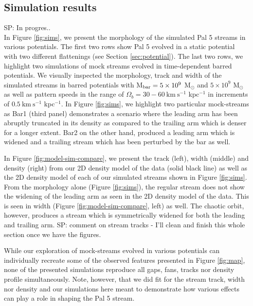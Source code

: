 \documentclass[twocolumn]{aastex62}
\newcommand{\kms}{\ensuremath{\textrm{km}~\textrm{s}^{-1}}}
\newcommand{\sa}[1]{{\color{magenta} SP: #1}}
\begin{document}
\subsection{Simulation results}
\label{sec:sim_results}
\sa{In progres..}\\
In Figure \ref{fig:sims}, we present the morphology of the simulated Pal 5 streams in various potentials.
The first two rows show Pal 5 evolved in a static potential with two different flattenings (see Section \ref{sec:potential}).
The last two rows, we highlight two simulations of mock streams evolved in time-dependent barred potentials. We visually inspected the morphology, track and width of the simulated streams in barred potentials with M$_{\rm bar} = 5\times 10^9$ M$_{\odot}$ and $5\times 10^9$ M$_{\odot}$ as well as pattern speeds in the range of $\Omega_b = 30-60 ~\kms$ kpc$^{-1}$ in increments of $0.5~\kms$ kpc$^{-1}$. In Figure \ref{fig:sims}, we highlight two particular mock-streams as Bar1 (third panel) demonstrates a scenario where the leading arm has been abruptly truncated in its density as compared to the trailing arm which is denser for a longer extent. Bar2 on the other hand, produced a leading arm which is widened  and a trailing stream which has been perturbed by the bar as well. 

In Figure \ref{fig:model-sim-compare}, we present the track (left), width (middle) and density (right) from our 2D density model of the data (solid black line) as well as the 2D density model of each of our simulated streams shown in Figure \ref{fig:sims}. From the morphology alone (Figure \ref{fig:sims}), the regular stream does not show the widening of the leading arm as seen in the 2D density model of the data. This is seen in width (Figure \ref{fig:model-sim-compare}, left) as well. The chaotic orbit, however, produces a stream which is symmetrically widened for both the leading and trailing arm. \sa{comment on stream tracks - I'll clean and finish this whole section once we have the figures}. 

While our exploration of mock-streams evolved in various potentials can individually recreate some of the observed features presented in Figure \ref{fig:map}, none of the presented simulations reproduce all gaps, fans, tracks nor density profile simultaneously. Note, however, that we did fit for the stream track, width nor density and our simulations here meant to demonstrate how various effects can play a role in shaping the Pal 5 stream. 
\end{document}
